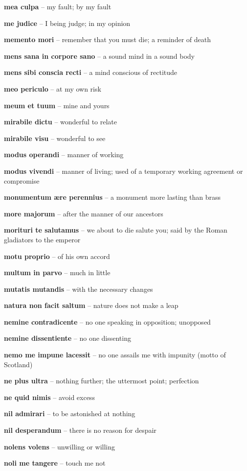 \documentclass[12pt]{article}
\newcommand{\lat}[1]{\textbf{#1}}
\begin{document}
\lat{mea culpa} -- my fault; by my fault

\lat{me judice} -- I being judge; in my opinion

\lat{memento mori} -- remember that you must die; a reminder of death

\lat{mens sana in corpore sano} -- a sound mind in a sound body

\lat{mens sibi conscia recti} -- a mind conscious of rectitude

\lat{meo periculo} -- at my own risk

\lat{meum et tuum} -- mine and yours

\lat{mirabile dictu} -- wonderful to relate

\lat{mirabile visu} -- wonderful to see

\lat{modus operandi} -- manner of working

\lat{modus vivendi} -- manner of living; used of a temporary working agreement or compromise

\lat{monumentum \ae{re} perennius} -- a monument more lasting than brass

\lat{more majorum} -- after the manner of our ancestors

\lat{morituri te salutamus} -- we about to die salute you; said by the Roman gladiators to the emperor

\lat{motu proprio} -- of his own accord

\lat{multum in parvo} -- much in little

\lat{mutatis mutandis} -- with the necessary changes

\lat{natura non facit saltum} -- nature does not make a leap

\lat{nemine contradicente} -- no one speaking in opposition; unopposed

\lat{nemine dissentiente} -- no one dissenting

\lat{nemo me impune lacessit} -- no one assails me with impunity (motto of Scotland)

\lat{ne plus ultra} -- nothing further; the uttermost point; perfection

\lat{ne quid nimis} -- avoid excess

\lat{nil admirari} -- to be astonished at nothing

\lat{nil desperandum} -- there is no reason for despair

\lat{nolens volens} -- unwilling or willing

\lat{noli me tangere} -- touch me not
\end{document}
